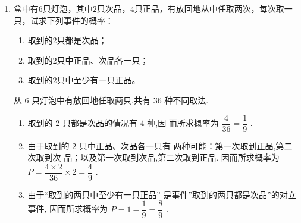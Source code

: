 \begin{enumerate}
\item 盒中有$6$只灯泡，其中$2$只次品，$4$只正品，有放回地从中任取两次，每次取一只，试求下列事件的概率：

\begin{enumerate}
\item 取到的$2$只都是次品；
\item 取到的$2$只中正品、次品各一只；
\item 取到的$2$只中至少有一只正品。
\end{enumerate}

\begin{jieda}
    从 6 只灯泡中有放回地任取两只,共有
36 种不同取法.
    \begin{enumerate}
    \item 取到的 2 只都是次品的情况有 4 种,因
而所求概率为 $\dfrac{4}{36} = \dfrac{1}{9}$ .
\item 由于取到的 2 只中正品、次品各一只有
两种可能：第一次取到正品,第二次取到次
品；以及第一次取到次品,第二次取到正品.
因而所求概率为 $P = \dfrac{4 \times  2}{36} \times  2 = \dfrac{4}{9}$ .
    \item  由于“取到的两只中至少有一只正品”
是事件”取到的两只都是次品”的对立事件,
因而所求概率为 $P = 1 - \dfrac{1}{9} = \dfrac{8}{9}$ .
    \end{enumerate}
\end{jieda}

\end{enumerate}




\clearpage

